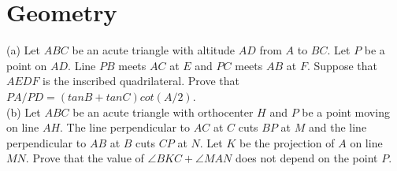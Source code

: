 \documentclass{subfile}
\begin{document}
	\section{Geometry}
	\begin{problem}
		(a) Let $ABC$ be an acute triangle with altitude $AD$ from $A$ to $BC$. Let $P$ be a point on $AD$. Line
		$PB$ meets $AC$ at $E$ and $PC$ meets $AB$ at $F$. Suppose that $AEDF$ is the inscribed quadrilateral.
		Prove that $PA/PD = (tanB + tanC)cot(A/2)$.\\
		(b) Let $ABC$ be an acute triangle with orthocenter $H$ and $P$ be a point moving on line $AH$. The
		line perpendicular to $AC$ at $C$ cuts $BP$ at $M$ and the line perpendicular to $AB$ at $B$ cuts $CP$
		at $N$. Let $K$ be the projection of $A$ on line $MN$. Prove that the value of $\angle BKC + \angle MAN$
		does not depend on the point $P$.
	\end{problem}
\end{document}

